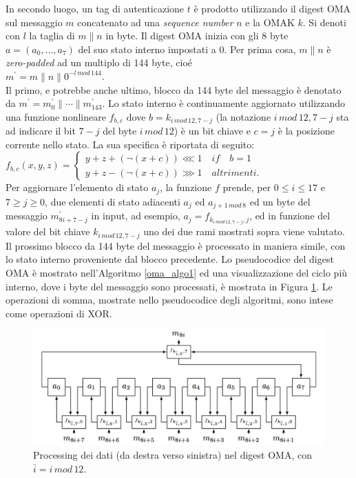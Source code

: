 In secondo luogo, un tag di autenticazione $t$ è prodotto utilizzando il digest OMA sul messaggio $m$ concatenato ad una \emph{sequence number} $n$ e la OMAK $k$. Si denoti con $l$ la taglia di $m\|n$ in byte. Il digest OMA inizia con gli 8 byte $a = (a_0, \ldots, a_7)$ del suo stato interno impostati a 0. Per prima cosa, $m\|n$ è \emph{zero-padded} ad un multiplo di 144 byte, cioé\\
\indent $m^\prime = m \| n \| 0^{-l\, mod\, 144}$.\\
Il primo, e potrebbe anche ultimo, blocco da 144 byte del messaggio è denotato da $m^\prime = m^\prime_0 \| \cdots \| m^\prime_{143}$. Lo stato interno è continuamente aggiornato utilizzando una funzione nonlineare $f_{b,c}$ dove $b = k_{i\, mod\, 12, 7-j}$ (la notazione $i\, mod\, 12, 7-j$ sta ad indicare il bit $7-j$ del byte $i\,mod\,12$) è un bit chiave e $c = j$ è la posizione corrente nello stato. La sua specifica è riportata di seguito:\\
\indent   $f_{b,c}(x,y,z)=
\begin{cases}
	y + z + (\neg(x + c)) \lll 1\quad if\quad b=1\\
	y + z - (\neg(x + c)) \ggg 1\quad altrimenti.
\end{cases}$\\
Per aggiornare l'elemento di stato $a_j$, la funzione $f$ prende, per $0 \leq i \leq 17$ e $7 \geq j \geq 0$, due elementi di stato adiacenti $a_j$ ed $a_{j+1\, mod\, 8}$ ed un byte del messaggio $m^\prime_{8i+7-j}$ in input, ad esempio, $a_j = f_{k_{i\,mod\,12,7-j},j}$, ed in funzione del valore del bit chiave $k_{i\,mod\,12,7-j}$ uno dei due rami mostrati sopra viene valutato. Il prossimo blocco da 144 byte del messaggio è processato in maniera simile, con lo stato interno proveniente dal blocco precedente. Lo pseudocodice del digest OMA è mostrato nell'Algoritmo \ref{oma_algo1} ed una visualizzazione del ciclo più interno, dove i byte del messaggio sono processati, è mostrata in Figura \ref{inneroma_img}. Le operazioni di somma, mostrate nello pseudocodice degli algoritmi, sono intese come operazioni di XOR.
\begin{figure}[hbtp]
	\centering
	\includegraphics[scale=.3]{imgs/attack/oma_innerloop.png}
	\caption{Processing dei dati (da destra verso sinistra) nel digest OMA, con $\bar i = i\,mod\,12$.}
	\label{inneroma_img}
\end{figure}
